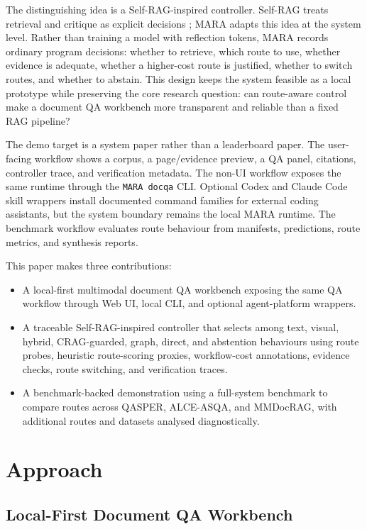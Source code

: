The distinguishing idea is a Self-RAG-inspired controller. Self-RAG treats retrieval and critique as explicit decisions \citep{asai2023selfrag}; MARA adapts this idea at the system level. Rather than training a model with reflection tokens, MARA records ordinary program decisions: whether to retrieve, which route to use, whether evidence is adequate, whether a higher-cost route is justified, whether to switch routes, and whether to abstain. This design keeps the system feasible as a local prototype while preserving the core research question: can route-aware control make a document QA workbench more transparent and reliable than a fixed RAG pipeline?

The demo target is a system paper rather than a leaderboard paper. The user-facing workflow shows a corpus, a page/evidence preview, a QA panel, citations, controller trace, and verification metadata. The non-UI workflow exposes the same runtime through the \texttt{MARA docqa} CLI. Optional Codex and Claude Code skill wrappers install documented command families for external coding assistants, but the system boundary remains the local MARA runtime. The benchmark workflow evaluates route behaviour from manifests, predictions, route metrics, and synthesis reports.

This paper makes three contributions:
\begin{itemize}
    \item A local-first multimodal document QA workbench exposing the same QA workflow through Web UI, local CLI, and optional agent-platform wrappers.
    \item A traceable Self-RAG-inspired controller that selects among text, visual, hybrid, CRAG-guarded, graph, direct, and abstention behaviours using route probes, heuristic route-scoring proxies, workflow-cost annotations, evidence checks, route switching, and verification traces.
    \item A benchmark-backed demonstration using a full-system benchmark to compare routes across QASPER, ALCE-ASQA, and MMDocRAG, with additional routes and datasets analysed diagnostically.
\end{itemize}

\section{Approach}

\subsection{Local-First Document QA Workbench}

